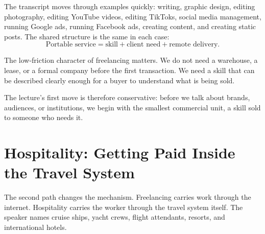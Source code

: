 The transcript moves through examples quickly: writing, graphic design, editing photography, editing YouTube videos, editing TikToks, social media management, running Google ads, running Facebook ads, creating content, and creating static posts. The shared structure is the same in each case:
\begin{equation}
\text{Portable service}
=
\text{skill}
+
\text{client need}
+
\text{remote delivery}.
\end{equation}

The low-friction character of freelancing matters. We do not need a warehouse, a lease, or a formal company before the first transaction. We need a skill that can be described clearly enough for a buyer to understand what is being sold.

\begin{figure}
\centering
{}
\end{figure}

The lecture's first move is therefore conservative: before we talk about brands, audiences, or institutions, we begin with the smallest commercial unit, a skill sold to someone who needs it.

\section{Hospitality: Getting Paid Inside the Travel System}

The second path changes the mechanism. Freelancing carries work through the internet. Hospitality carries the worker through the travel system itself. The speaker names cruise ships, yacht crews, flight attendants, resorts, and international hotels.

